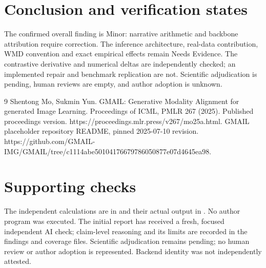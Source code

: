 \documentclass[10pt]{article}
\begin{document}
\section*{Conclusion and verification states}
The confirmed overall finding is Minor: narrative arithmetic and backbone attribution require correction. The inference architecture, real-data contribution, WMD convention and exact empirical effects remain Needs Evidence. The contrastive derivative and numerical deltas are independently checked; an implemented repair and benchmark replication are not. Scientific adjudication is pending, human reviews are empty, and author adoption is unknown.\par
9 Shentong Mo, Sukmin Yun. GMAIL: Generative Modality Alignment for generated Image Learning. Proceedings of ICML, PMLR 267 (2025). Published proceedings version. https://proceedings.mlr.press/v267/mo25a.html. GMAIL placeholder repository README, pinned 2025-07-10 revision. https://github.com/GMAIL-IMG/GMAIL/tree/c1114abe50104176679786050877e07d4645ea98.\par
\section*{Supporting checks}
The independent calculations are in and their actual output in . No author program was executed. The initial report has received a fresh, focused independent AI check; claim-level reasoning and its limits are recorded in the findings and coverage files. Scientific adjudication remains pending; no human review or author adoption is represented. Backend identity was not independently attested.\par
\end{document}
